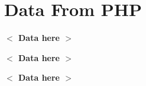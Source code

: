 \documentclass{article}
\newcommand{\placeholder}[1]{\textbf{$<$ #1 $>$}}
\newcommand{\titulotrabalho}{\placeholder{Data here}}
\newcommand{\autortrabalho}{\placeholder{Data here}}
\newcommand{\abstractrabalho}{\placeholder{Data here}}
\begin{document}
    \section{Data From PHP}
    \titulotrabalho{}

    \autortrabalho{}

    \abstractrabalho{}
\end{document}

